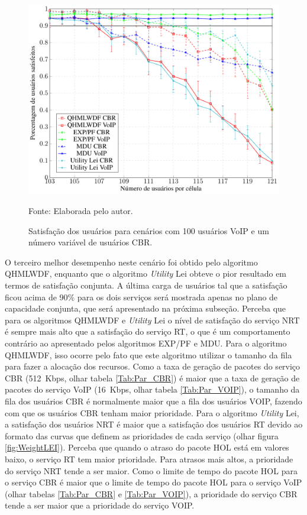 \begin{figure}[hb]
	\centering
	
	\caption[Satisfação dos usuários para cenários com 100 usuários VoIP e um número variável de usuários CBR]{Satisfação dos usuários para cenários com 100 usuários VoIP e um número variável de usuários CBR.}
	\includegraphics[width=.8\linewidth]{figs/100VOIP.pdf}
	
	{Fonte: Elaborada pelo autor.}
	\label{fig:100VOIP}
\end{figure}

O terceiro melhor desempenho neste cenário foi obtido pelo algoritmo QHMLWDF, enquanto que o algoritmo \textit{Utility} Lei obteve o pior resultado em termos de satisfação conjunta. A última carga de usuários tal que a satisfação ficou acima de 90\% para os dois serviços será mostrada apenas no plano de capacidade conjunta, que será apresentado na próxima subseção. Perceba que para os algoritmos QHMLWDF e \textit{Utility} Lei o nível de satisfação do serviço NRT é sempre mais alto que a satisfação do serviço RT, o que é um comportamento contrário ao apresentado pelos algoritmos EXP/PF e MDU. Para o algoritmo QHMLWDF, isso ocorre pelo fato que este algoritmo utilizar o tamanho da fila para fazer a alocação dos recursos. Como a taxa de geração de pacotes do serviço CBR (512~Kbps, olhar tabela \ref{Tab:Par_CBR}) é maior que a taxa de geração de pacotes do serviço VoIP (16~Kbps, olhar tabela \ref{Tab:Par_VOIP}), o tamanho da fila dos usuários CBR é normalmente maior que a fila dos usuários VOIP, fazendo com que os usuários CBR tenham maior prioridade. Para o algoritmo \textit{Utility} Lei, a satisfação dos usuários NRT é maior que a satisfação dos usuários RT devido ao formato das curvas que definem as prioridades de cada serviço (olhar figura \ref{fig:WeightLEI}). Perceba que quando o atraso do pacote HOL está em valores baixo, o serviço RT tem maior prioridade. Para atrasos mais altos, a prioridade do serviço NRT tende a ser maior. Como o limite de tempo do pacote HOL para o serviço CBR é maior que o limite de tempo do pacote HOL para o serviço VoIP (olhar tabelas \ref{Tab:Par_CBR} e \ref{Tab:Par_VOIP}), a prioridade do serviço CBR tende a ser maior que a prioridade do serviço VOIP. 


